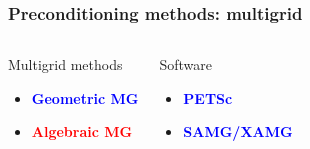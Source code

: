 \documentclass[handout]{beamer}
{
\usepackage{fullpage}
\usepackage{hyperref}
\usepackage{amssymb} 
}
\newcommand{\red}[1]{\textcolor{red}{#1}}
\newcommand{\blue}[1]{\textcolor{blue}{#1}}
\begin{document}
\begin{frame}
\frametitle{Preconditioning methods: multigrid}
\begin{columns}[t]
\begin{block}{Multigrid methods}
\begin{itemize}
\item \blue{\bf{Geometric MG}}
\item \red{\bf{Algebraic MG}}
\end{itemize}
\end{block}
\begin{block}{Software}
\begin{itemize}
\item \blue{\bf{PETSc}}
\item \blue{\bf{SAMG/XAMG}}
\end{itemize}
\end{block}
\end{columns}

\end{frame}
\end{document}
